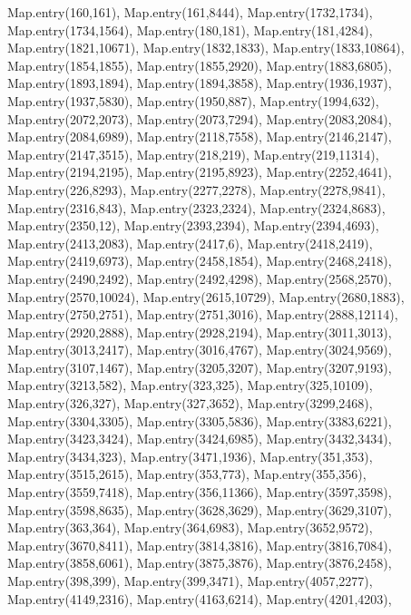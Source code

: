     Map.entry(160,161),
    Map.entry(161,8444),
    Map.entry(1732,1734),
    Map.entry(1734,1564),
    Map.entry(180,181),
    Map.entry(181,4284),
    Map.entry(1821,10671),
    Map.entry(1832,1833),
    Map.entry(1833,10864),
    Map.entry(1854,1855),
    Map.entry(1855,2920),
    Map.entry(1883,6805),
    Map.entry(1893,1894),
    Map.entry(1894,3858),
    Map.entry(1936,1937),
    Map.entry(1937,5830),
    Map.entry(1950,887),
    Map.entry(1994,632),
    Map.entry(2072,2073),
    Map.entry(2073,7294),
    Map.entry(2083,2084),
    Map.entry(2084,6989),
    Map.entry(2118,7558),
    Map.entry(2146,2147),
    Map.entry(2147,3515),
    Map.entry(218,219),
    Map.entry(219,11314),
    Map.entry(2194,2195),
    Map.entry(2195,8923),
    Map.entry(2252,4641),
    Map.entry(226,8293),
    Map.entry(2277,2278),
    Map.entry(2278,9841),
    Map.entry(2316,843),
    Map.entry(2323,2324),
    Map.entry(2324,8683),
    Map.entry(2350,12),
    Map.entry(2393,2394),
    Map.entry(2394,4693),
    Map.entry(2413,2083),
    Map.entry(2417,6),
    Map.entry(2418,2419),
    Map.entry(2419,6973),
    Map.entry(2458,1854),
    Map.entry(2468,2418),
    Map.entry(2490,2492),
    Map.entry(2492,4298),
    Map.entry(2568,2570),
    Map.entry(2570,10024),
    Map.entry(2615,10729),
    Map.entry(2680,1883),
    Map.entry(2750,2751),
    Map.entry(2751,3016),
    Map.entry(2888,12114),
    Map.entry(2920,2888),
    Map.entry(2928,2194),
    Map.entry(3011,3013),
    Map.entry(3013,2417),
    Map.entry(3016,4767),
    Map.entry(3024,9569),
    Map.entry(3107,1467),
    Map.entry(3205,3207),
    Map.entry(3207,9193),
    Map.entry(3213,582),
    Map.entry(323,325),
    Map.entry(325,10109),
    Map.entry(326,327),
    Map.entry(327,3652),
    Map.entry(3299,2468),
    Map.entry(3304,3305),
    Map.entry(3305,5836),
    Map.entry(3383,6221),
    Map.entry(3423,3424),
    Map.entry(3424,6985),
    Map.entry(3432,3434),
    Map.entry(3434,323),
    Map.entry(3471,1936),
    Map.entry(351,353),
    Map.entry(3515,2615),
    Map.entry(353,773),
    Map.entry(355,356),
    Map.entry(3559,7418),
    Map.entry(356,11366),
    Map.entry(3597,3598),
    Map.entry(3598,8635),
    Map.entry(3628,3629),
    Map.entry(3629,3107),
    Map.entry(363,364),
    Map.entry(364,6983),
    Map.entry(3652,9572),
    Map.entry(3670,8411),
    Map.entry(3814,3816),
    Map.entry(3816,7084),
    Map.entry(3858,6061),
    Map.entry(3875,3876),
    Map.entry(3876,2458),
    Map.entry(398,399),
    Map.entry(399,3471),
    Map.entry(4057,2277),
    Map.entry(4149,2316),
    Map.entry(4163,6214),
    Map.entry(4201,4203),
